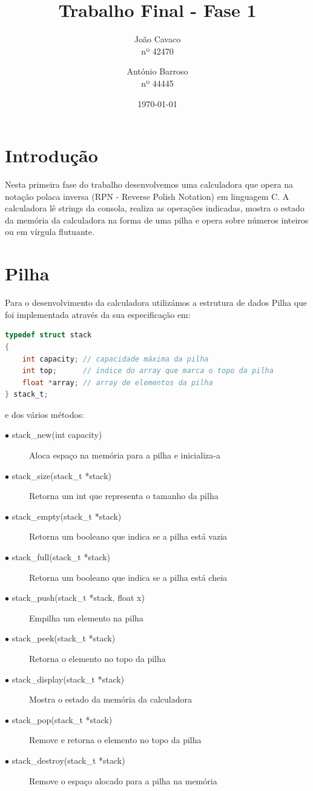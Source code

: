 \documentclass[titlepage,12pt]{article}   %
\title{Trabalho Final - Fase 1}
\author{João Cavaco\\nº 42470 \and António Barroso\\nº 44445}
\date{\today}
\begin{document}
\maketitle
\tableofcontents
\section{Introdução}

Nesta primeira fase do trabalho desenvolvemos uma calculadora que opera na notação polaca inversa (RPN - Reverse Polish Notation) em linguagem C. A calculadora lê strings da consola, realiza as operações indicadas, mostra o estado da memória da calculadora na forma de uma pilha e opera sobre números inteiros ou em vírgula flutuante.
\section{Pilha}
Para o desenvolvimento da calculadora utilizámos a estrutura de dados Pilha que foi implementada através da sua especificação em:
\begin{lstlisting}[language={C}]
typedef struct stack
{
    int capacity; // capacidade máxima da pilha
    int top;      // indice do array que marca o topo da pilha
    float *array; // array de elementos da pilha
} stack_t;
\end{lstlisting}
e dos vários métodos: 
\begin{description}
  \item[$\bullet$ stack\_new(int capacity)] Aloca espaço na memória para a pilha e inicializa-a
  \item[$\bullet$ stack\_size(stack\_t *stack)] Retorna um int que representa o tamanho da pilha
  \item[$\bullet$ stack\_empty(stack\_t *stack)] Retorna um booleano que indica se a pilha está vazia
  \item[$\bullet$ stack\_full(stack\_t *stack)] Retorna um booleano que indica se a pilha está cheia
  \item[$\bullet$ stack\_push(stack\_t *stack, float x)] Empilha um elemento na pilha 
  \item[$\bullet$ stack\_peek(stack\_t *stack)] Retorna o elemento no topo da pilha 
  \item[$\bullet$ stack\_display(stack\_t *stack)] Mostra o estado da memória da calculadora
  \item[$\bullet$ stack\_pop(stack\_t *stack)] Remove e retorna o elemento no topo da pilha  
  \item[$\bullet$ stack\_destroy(stack\_t *stack)] Remove o espaço alocado para a pilha na memória
\end{description}
\end{document}

